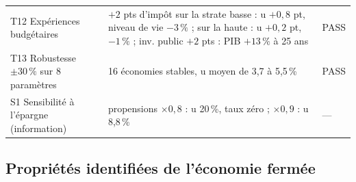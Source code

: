 \documentclass[11pt,a4paper]{article}
\begin{document}
\begin{center}
\begin{longtable}{p{4.6cm}p{7.6cm}p{1.6cm}}
T12 Expériences budgétaires & $+2$ pts d'impôt sur la strate basse : u $+0{,}8$ pt, niveau de vie $-3\,\%$ ; sur la haute : u $+0{,}2$ pt, $-1\,\%$ ; inv. public $+2$ pts : PIB $+13\,\%$ à 25 ans & PASS\\
T13 Robustesse $\pm30\,\%$ sur 8 paramètres & 16 économies stables, u moyen de 3,7 à 5,5\,\% & PASS\\
S1 Sensibilité à l'épargne (information) & propensions $\times0{,}8$ : u 20\,\%, taux zéro ; $\times0{,}9$ : u 8,8\,\% & ---\\
\bottomrule
\end{longtable}
\end{center}

\subsection{Propriétés identifiées de l'économie fermée}
\end{document}
